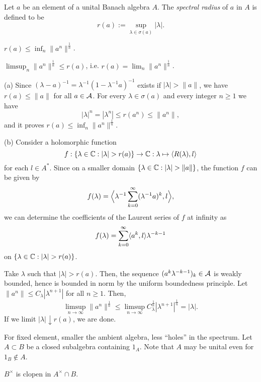 \documentclass{../../large}
\begin{document}
\begin{prb}
Let $a$ be an element of a unital Banach algebra $A$.
The \emph{spectral radius} of $a$ in $A$ is defined to be
\[r(a):=\sup_{\lambda\in\sigma(a)}|\lambda|.\]
\begin{parts}
\item $r(a)\le\inf_n\|a^n\|^{\frac1n}$.
\item $\limsup_n\|a^n\|^{\frac1n}\le r(a)$, i.e. $r(a)=\lim_n\|a^n\|^{\frac1n}$.
\end{parts}
\end{prb}
\begin{pf}
(a)
Since $(\lambda-a)^{-1}=\lambda^{-1}(1-\lambda^{-1}a)^{-1}$ exists if $|\lambda|>\|a\|$, we have $r(a)\le\|a\|$ for all $a\in\mathcal{A}$.
For every $\lambda\in\sigma(a)$ and every integer $n\ge1$ we have
\[|\lambda|^n=|\lambda^n|\le r(a^n)\le\|a^n\|,\]
and it proves $r(a)\le\inf_n\|a^n\|^{\frac1n}$.

(b)
Consider a holomorphic function
\[f:\{\lambda\in\C:|\lambda|>r(a)\}\to\C:\lambda\mapsto\<R(\lambda),l\>\]
for each $l\in A^*$.
Since on a smaller domain $\{\lambda\in\C:|\lambda|>\|a\|\}$, the function $f$ can be given by
\[f(\lambda)=\Bigl\langle\lambda^{-1}\sum_{k=0}^\infty(\lambda^{-1}a)^k,l\Bigr\rangle,\]
we can determine the coefficients of the Laurent series of $f$ at infinity as
\[f(\lambda)=\sum_{k=0}^\infty\langle a^k,l\rangle\lambda^{-k-1}\]
on $\{\lambda\in\C:|\lambda|>r(a)\}$.

Take $\lambda$ such that $|\lambda|>r(a)$.
Then, the sequence $(a^k\lambda^{-k-1})_k\in\mathcal{A}$ is weakly bounded, hence is bounded in norm by the uniform boundedness principle.
Let $\|a^n\|\le C_\lambda|\lambda^{n+1}|$ for all $n\ge1$.
Then,
\[\limsup_{n\to\infty}\|a^n\|^{\frac1n}\le\limsup_{n\to\infty}C_\lambda^{\frac1n}|\lambda^{n+1}|^{\frac1n}=|\lambda|.\]
If we limit $|\lambda|\downarrow r(a)$, we are done.
\end{pf}

\begin{prb}
For fixed element, smaller the ambient algebra, less ``holes'' in the spectrum.
Let $A\subset B$ be a closed subalgebra containing $1_A$.
Note that $A$ may be unital even for $1_B\notin A$.
\begin{parts}
\item $B^\times$ is clopen in $A^\times\cap B$.
\end{parts}
\end{prb}
\end{document}
